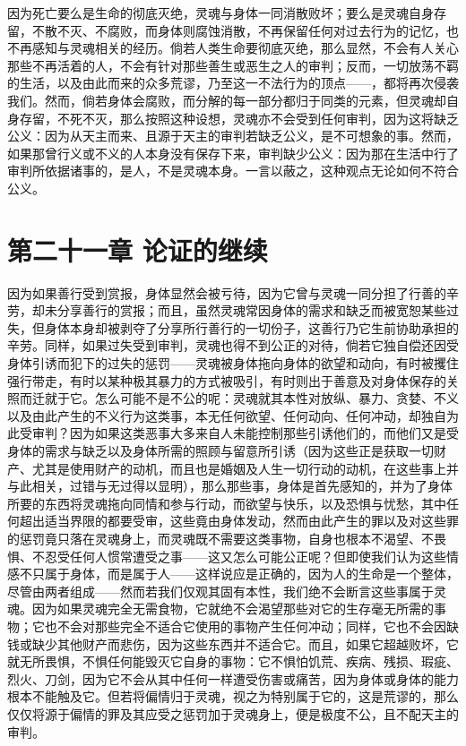 因为死亡要么是生命的彻底灭绝，灵魂与身体一同消散败坏；要么是灵魂自身存留，不散不灭、不腐败，而身体则腐蚀消散，不再保留任何对过去行为的记忆，也不再感知与灵魂相关的经历。倘若人类生命要彻底灭绝，那么显然，不会有人关心那些不再活着的人，不会有针对那些善生或恶生之人的审判；反而，一切放荡不羁的生活，以及由此而来的众多荒谬，乃至这一不法行为的顶点——，都将再次侵袭我们。然而，倘若身体会腐败，而分解的每一部分都归于同类的元素，但灵魂却自身存留，不死不灭，那么按照这种设想，灵魂亦不会受到任何审判，因为这将缺乏公义：因为从天主而来、且源于天主的审判若缺乏公义，是不可想象的事。然而，如果那曾行义或不义的人本身没有保存下来，审判缺少公义：因为那在生活中行了审判所依据诸事的，是人，不是灵魂本身。一言以蔽之，这种观点无论如何不符合公义。\par


\section{第二十一章 论证的继续}

因为如果善行受到赏报，身体显然会被亏待，因为它曾与灵魂一同分担了行善的辛劳，却未分享善行的赏报；而且，虽然灵魂常因身体的需求和缺乏而被宽恕某些过失，但身体本身却被剥夺了分享所行善行的一切份子，这善行乃它生前协助承担的辛劳。同样，如果过失受到审判，灵魂也得不到公正的对待，倘若它独自偿还因受身体引诱而犯下的过失的惩罚——灵魂被身体拖向身体的欲望和动向，有时被攫住强行带走，有时以某种极其暴力的方式被吸引，有时则出于善意及对身体保存的关照而迁就于它。怎么可能不是不公的呢：灵魂就其本性对放纵、暴力、贪婪、不义以及由此产生的不义行为这类事，本无任何欲望、任何动向、任何冲动，却独自为此受审判？因为如果这类恶事大多来自人未能控制那些引诱他们的，而他们又是受身体的需求与缺乏以及身体所需的照顾与留意所引诱（因为这些正是获取一切财产、尤其是使用财产的动机，而且也是婚姻及人生一切行动的动机，在这些事上并与此相关，过错与无过得以显明），那么那些事，身体是首先感知的，并为了身体所要的东西将灵魂拖向同情和参与行动，而欲望与快乐，以及恐惧与忧愁，其中任何超出适当界限的都要受审，这些竟由身体发动，然而由此产生的罪以及对这些罪的惩罚竟只落在灵魂身上，而灵魂既不需要这类事物，自身也根本不渴望、不畏惧、不忍受任何人惯常遭受之事——这又怎么可能公正呢？但即使我们认为这些情感不只属于身体，而是属于人——这样说应是正确的，因为人的生命是一个整体，尽管由两者组成——然而若我们仅观其固有本性，我们绝不会断言这些事属于灵魂。因为如果灵魂完全无需食物，它就绝不会渴望那些对它的生存毫无所需的事物；它也不会对那些完全不适合它使用的事物产生任何冲动；同样，它也不会因缺钱或缺少其他财产而悲伤，因为这些东西并不适合它。而且，如果它超越败坏，它就无所畏惧，不惧任何能毁灭它自身的事物：它不惧怕饥荒、疾病、残损、瑕疵、烈火、刀剑，因为它不会从其中任何一样遭受伤害或痛苦，因为身体或身体的能力根本不能触及它。但若将偏情归于灵魂，视之为特别属于它的，这是荒谬的，那么仅仅将源于偏情的罪及其应受之惩罚加于灵魂身上，便是极度不公，且不配天主的审判。\par

